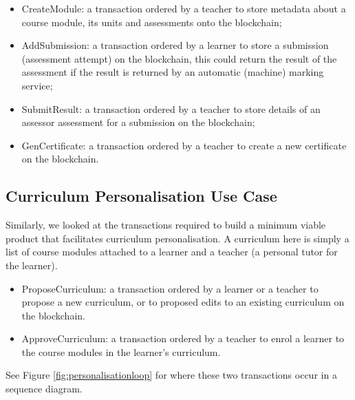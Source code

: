 \begin{itemize}
	\setlength\itemsep{0em}
	\item CreateModule: a transaction ordered by a teacher to store metadata about a course module,
	      its units and assessments onto the blockchain;
	\item AddSubmission: a transaction ordered by a learner to store a submission (assessment attempt)
	      on the blockchain, this could return the result of the assessment if the result is returned by
	      an automatic (machine) marking service;
	\item SubmitResult: a transaction ordered by a teacher to store details of an assessor assessment
	      for a submission on the blockchain;
	\item GenCertificate: a transaction ordered by a teacher to create a new certificate on the blockchain.
\end{itemize}

\subsection{Curriculum Personalisation Use Case}

Similarly, we looked at the transactions required to build a minimum viable product
that facilitates curriculum personalisation. A curriculum here is simply a list of course
modules attached to a learner and a teacher (a personal tutor for the learner).

\begin{itemize}
	\setlength\itemsep{0em}
	\item ProposeCurriculum: a transaction ordered by a learner or a teacher to propose
	      a new curriculum, or to proposed edits to an existing curriculum on the blockchain.
	\item ApproveCurriculum: a transaction ordered by a teacher to enrol a learner to
	      the course modules in the learner's curriculum.
\end{itemize}

See Figure \ref{fig:personalisationloop} for where these two transactions occur in a sequence diagram.

